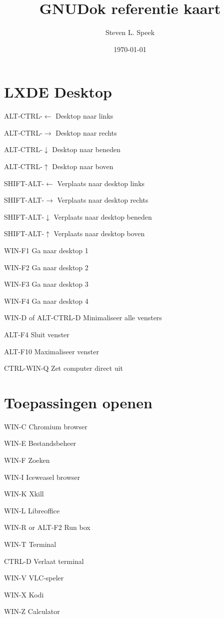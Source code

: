 \documentclass[10pt]{article}
\title{GNUDok referentie kaart}
\author{Steven L. Speek}
\date{\today{}}
\renewcommand{\maketitle}{%
{\begin{center}\Large \mythetitle\end{center}}
}
\begin{document}
\begin{multicols}{3}
	\maketitle

	\section{LXDE Desktop}
	\begin{ttdesc}[labelwidth=\widthof{\texttt{ALT-SHIFT-$\leftarrow$}}]
	\item[ALT-CTRL-$\leftarrow$] Desktop naar links
	\item[ALT-CTRL-$\rightarrow$] Desktop naar rechts
	\item[ALT-CTRL-$\downarrow$] Desktop naar beneden
	\item[ALT-CTRL-$\uparrow$] Desktop naar boven
	\item[SHIFT-ALT-$\leftarrow$] Verplaats naar desktop links
	\item[SHIFT-ALT-$\rightarrow$]Verplaats naar desktop rechts
	\item[SHIFT-ALT-$\downarrow$] Verplaats naar desktop beneden
	\item[SHIFT-ALT-$\uparrow$] Verplaats naar desktop boven
	\item[WIN-F1] Ga naar desktop 1
	\item[WIN-F2] Ga naar desktop 2
	\item[WIN-F3] Ga naar desktop 3
	\item[WIN-F4] Ga naar desktop 4
	\item[WIN-D of ALT-CTRL-D] Minimaliseer alle vensters
	\item[ALT-F4] Sluit venster
	\item[ALT-F10] Maximaliseer venster
	\item[CTRL-WIN-Q] Zet computer direct uit
	\end{ttdesc}
	\section{Toepassingen openen}
	\begin{ttdesc}[labelwidth=\widthof{\texttt{WIN-E or ALT-F2}}]
	\item[WIN-C] Chromium browser
	\item[WIN-E] Bestandsbeheer
	\item[WIN-F] Zoeken
	\item[WIN-I] Iceweasel browser
	\item[WIN-K] Xkill
	\item[WIN-L] Libreoffice
	\item[WIN-R or ALT-F2] Run box
	\item[WIN-T] Terminal
	\item[CTRL-D] Verlaat terminal
	\item[WIN-V] VLC-speler
	\item[WIN-X] Kodi
	\item[WIN-Z] Calculator
	\end{ttdesc}

\end{multicols}
\end{document}
